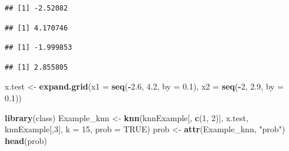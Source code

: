 \documentclass[]{article}
\newenvironment{Shaded}{\begin{snugshade}}{\end{snugshade}}
\newcommand{\KeywordTok}[1]{\textcolor[rgb]{0.13,0.29,0.53}{\textbf{#1}}}
\newcommand{\DataTypeTok}[1]{\textcolor[rgb]{0.13,0.29,0.53}{#1}}
\newcommand{\DecValTok}[1]{\textcolor[rgb]{0.00,0.00,0.81}{#1}}
\newcommand{\FloatTok}[1]{\textcolor[rgb]{0.00,0.00,0.81}{#1}}
\newcommand{\StringTok}[1]{\textcolor[rgb]{0.31,0.60,0.02}{#1}}
\newcommand{\OtherTok}[1]{\textcolor[rgb]{0.56,0.35,0.01}{#1}}
\newcommand{\OperatorTok}[1]{\textcolor[rgb]{0.81,0.36,0.00}{\textbf{#1}}}
\newcommand{\NormalTok}[1]{#1}
\begin{document}
\begin{verbatim}
## [1] -2.52082
\end{verbatim}

\begin{Shaded}
\end{Shaded}

\begin{verbatim}
## [1] 4.170746
\end{verbatim}

\begin{Shaded}
\end{Shaded}

\begin{verbatim}
## [1] -1.999853
\end{verbatim}

\begin{Shaded}
\end{Shaded}

\begin{verbatim}
## [1] 2.855805
\end{verbatim}

\begin{Shaded}
\begin{Highlighting}[]
\NormalTok{x.test <-}\StringTok{ }\KeywordTok{expand.grid}\NormalTok{(}\DataTypeTok{x1 =} \KeywordTok{seq}\NormalTok{(}\OperatorTok{-}\FloatTok{2.6}\NormalTok{, }\FloatTok{4.2}\NormalTok{, }\DataTypeTok{by =} \FloatTok{0.1}\NormalTok{), }\DataTypeTok{x2 =} \KeywordTok{seq}\NormalTok{(}\OperatorTok{-}\DecValTok{2}\NormalTok{, }\FloatTok{2.9}\NormalTok{, }\DataTypeTok{by =} \FloatTok{0.1}\NormalTok{))}
\end{Highlighting}
\end{Shaded}

\begin{Shaded}
\begin{Highlighting}[]
\KeywordTok{library}\NormalTok{(class)}
\NormalTok{Example_knn <-}\StringTok{ }\KeywordTok{knn}\NormalTok{(knnExample[, }\KeywordTok{c}\NormalTok{(}\DecValTok{1}\NormalTok{, }\DecValTok{2}\NormalTok{)], x.test, knnExample[,}\DecValTok{3}\NormalTok{], }\DataTypeTok{k =} \DecValTok{15}\NormalTok{, }\DataTypeTok{prob =} \OtherTok{TRUE}\NormalTok{)}
\NormalTok{prob <-}\StringTok{ }\KeywordTok{attr}\NormalTok{(Example_knn, }\StringTok{"prob"}\NormalTok{)}
\KeywordTok{head}\NormalTok{(prob)}
\end{Highlighting}
\end{Shaded}
\end{document}
